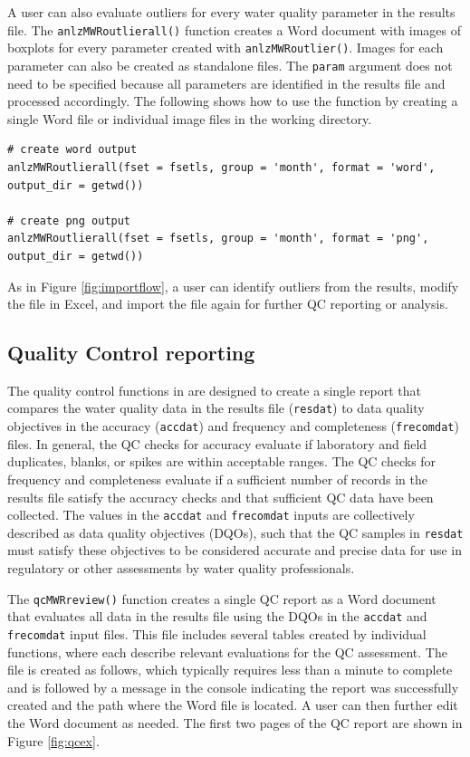 A user can also evaluate outliers for every water quality parameter in the results file. The \texttt{anlzMWRoutlierall()} function creates a Word document with images of boxplots for every parameter created with \texttt{anlzMWRoutlier()}. Images for each parameter can also be created as standalone files. The \texttt{param} argument does not need to be specified because all parameters are identified in the results file and processed accordingly. The following shows how to use the function by creating a single Word file or individual image files in the working directory.

\begin{verbatim}
# create word output
anlzMWRoutlierall(fset = fsetls, group = 'month', format = 'word', output_dir = getwd())

# create png output
anlzMWRoutlierall(fset = fsetls, group = 'month', format = 'png', output_dir = getwd())
\end{verbatim}

As in Figure \ref{fig:importflow}, a user can identify outliers from the results, modify the file in Excel, and import the file again for further QC reporting or analysis.

\hypertarget{quality-control-reporting}{%
\subsection{Quality Control reporting}\label{quality-control-reporting}}

The quality control functions in  are designed to create a single report that compares the water quality data in the results file (\texttt{resdat}) to data quality objectives in the accuracy (\texttt{accdat}) and frequency and completeness (\texttt{frecomdat}) files. In general, the QC checks for accuracy evaluate if laboratory and field duplicates, blanks, or spikes are within acceptable ranges. The QC checks for frequency and completeness evaluate if a sufficient number of records in the results file satisfy the accuracy checks and that sufficient QC data have been collected. The values in the \texttt{accdat} and \texttt{frecomdat} inputs are collectively described as data quality objectives (DQOs), such that the QC samples in \texttt{resdat} must satisfy these objectives to be considered accurate and precise data for use in regulatory or other assessments by water quality professionals.

The \texttt{qcMWRreview()} function creates a single QC report as a Word document that evaluates all data in the results file using the DQOs in the \texttt{accdat} and \texttt{frecomdat} input files. This file includes several tables created by individual  functions, where each describe relevant evaluations for the QC assessment. The file is created as follows, which typically requires less than a minute to complete and is followed by a message in the console indicating the report was successfully created and the path where the Word file is located. A user can then further edit the Word document as needed. The first two pages of the QC report are shown in Figure \ref{fig:qcex}.

